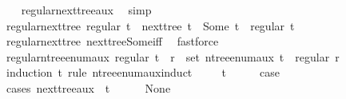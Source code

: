 \begin{isabellebody}
%
\isadelimproof
\ \ %
\endisadelimproof
%
\isatagproof
{}\isamarkupfalse%
\ regular{\isacharunderscore}{\kern0pt}next{\isacharunderscore}{\kern0pt}tree{\isacharunderscore}{\kern0pt}aux\ \isamarkupfalse%
\ simp%
\endisatagproof
{\isafoldproof}%
%
\isadelimproof
\isanewline
%
\endisadelimproof
\isanewline
{}\isamarkupfalse%
\ regular{\isacharunderscore}{\kern0pt}next{\isacharunderscore}{\kern0pt}tree{\isacharprime}{\kern0pt}{\isacharcolon}{\kern0pt}\ {\isachardoublequoteopen}regular\ t\ {\isasymLongrightarrow}\ next{\isacharunderscore}{\kern0pt}tree\ t\ {\isacharequal}{\kern0pt}\ Some\ t{\isacharprime}{\kern0pt}\ {\isasymLongrightarrow}\ regular\ t{\isacharprime}{\kern0pt}{\isachardoublequoteclose}\isanewline
%
\isadelimproof
\ \ %
\endisadelimproof
%
\isatagproof
{}\isamarkupfalse%
\ regular{\isacharunderscore}{\kern0pt}next{\isacharunderscore}{\kern0pt}tree\ next{\isacharunderscore}{\kern0pt}tree{\isacharunderscore}{\kern0pt}Some{\isacharunderscore}{\kern0pt}iff\ \isamarkupfalse%
\ fastforce%
\endisatagproof
{\isafoldproof}%
%
\isadelimproof
\isanewline
%
\endisadelimproof
\isanewline
{}\isamarkupfalse%
\ regular{\isacharunderscore}{\kern0pt}n{\isacharunderscore}{\kern0pt}tree{\isacharunderscore}{\kern0pt}enum{\isacharunderscore}{\kern0pt}aux{\isacharcolon}{\kern0pt}\ {\isachardoublequoteopen}regular\ t\ {\isasymLongrightarrow}\ r\ {\isasymin}\ set\ {\isacharparenleft}{\kern0pt}n{\isacharunderscore}{\kern0pt}tree{\isacharunderscore}{\kern0pt}enum{\isacharunderscore}{\kern0pt}aux\ t{\isacharparenright}{\kern0pt}\ {\isasymLongrightarrow}\ regular\ r{\isachardoublequoteclose}\isanewline
%
\isadelimproof
%
\endisadelimproof
%
\isatagproof
{}\isamarkupfalse%
\ {\isacharparenleft}{\kern0pt}induction\ t\ rule{\isacharcolon}{\kern0pt}\ n{\isacharunderscore}{\kern0pt}tree{\isacharunderscore}{\kern0pt}enum{\isacharunderscore}{\kern0pt}aux{\isachardot}{\kern0pt}induct{\isacharparenright}{\kern0pt}\isanewline
\ \ \isamarkupfalse%
\ {\isacharparenleft}{\kern0pt}{}\ t{\isacharparenright}{\kern0pt}\isanewline
\ \ \isamarkupfalse%
\ \isamarkupfalse%
\ {\isacharquery}{\kern0pt}case\isanewline
\ \ \isamarkupfalse%
\ {\isacharparenleft}{\kern0pt}cases\ {\isachardoublequoteopen}next{\isacharunderscore}{\kern0pt}tree{\isacharunderscore}{\kern0pt}aux\ {}\ t{\isachardoublequoteclose}{\isacharparenright}{\kern0pt}\isanewline
\ \ \ \ \isamarkupfalse%
\ None\isanewline

\end{isabellebody}
